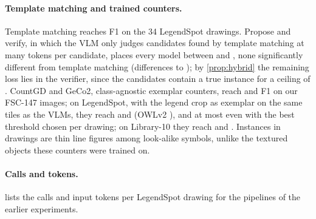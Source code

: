 \paragraph{Template matching and trained counters.} Template matching reaches \FTMdevAll{} F1 on the 34 LegendSpot drawings. Propose and verify, in which the VLM only judges candidates found by template matching at many tokens per candidate, places every model between \FHgptFiveFourAll{} and \FHqwenThreevlAll, none significantly different from template matching (differences \CHMinusTMdevgptFiveFour{} to \CHMinusTMdevqwenThreevl); by \cref{prop:hybrid} the remaining loss lies in the verifier, since the candidates contain a true instance for a ceiling of \HybBound. CountGD and GeCo2, class-agnostic exemplar counters, reach \XctrFsccountgd{} and \XctrFscgecoTwo{} F1 on our FSC-147 images; on LegendSpot, with the legend crop as exemplar on the same tiles as the VLMs, they reach \XlbFcountgd{} and \XlbFgecoTwo{} (OWLv2 \XlbFowlvTwo), and at most \XlbOraclegecoTwo{} even with the best threshold chosen per drawing; on Library-10 they reach \XlbRdcountgd{} and \XlbRdgecoTwo. Instances in drawings are thin line figures among look-alike symbols, unlike the textured objects these counters were trained on.

\paragraph{Calls and tokens.}  lists the calls and input tokens per LegendSpot drawing for the pipelines of the earlier experiments.

\begin{table}[t]
\centering
\footnotesize
{}
\caption{Calls and input tokens per LegendSpot test drawing (one run). Template matching runs locally in seconds.}
\label{tab:cost}
\end{table}
